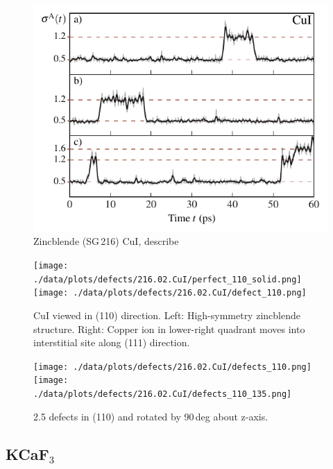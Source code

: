 \begin{figure}
	\includegraphics[width=\textwidth]{./data/plots/defects/216.02.CuI/sigma_vs_time.pdf}
	\caption{Zincblende (SG\,216) CuI, describe}
	\label{}
\end{figure}

\begin{figure}
	\texttt{[image: ./data/plots/defects/216.02.CuI/perfect\_110\_solid.png]} \hfill
	\texttt{[image: ./data/plots/defects/216.02.CuI/defect\_110.png]}
	\caption{CuI viewed in (110) direction. Left: High-symmetry zincblende structure. Right: Copper ion in lower-right quadrant moves into interstitial site along (111) direction.}
	\label{}
\end{figure}

\begin{figure}
	\texttt{[image: ./data/plots/defects/216.02.CuI/defects\_110.png]} \hfill
	\texttt{[image: ./data/plots/defects/216.02.CuI/defects\_110\_135.png]}
	\caption{2.5 defects in (110) and rotated by 90\,deg about z-axis.}
	\label{}
\end{figure}

\subsection{KCaF$_3$}

